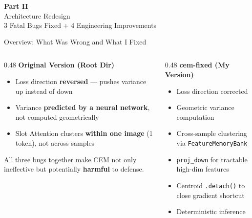\documentclass[aspectratio=169, 10pt]{beamer}
\newcommand{\fix}[1]{\textcolor{goodgreen}{\textbf{#1}}}
\newcommand{\code}[1]{\texttt{\small #1}}
\newcommand{\good}[1]{\textcolor{goodgreen}{#1}}
\newcommand{\bad}[1]{\textcolor{bugred}{#1}}
\begin{document}

\begin{frame}{}
\vfill
\begin{center}
{\Huge\textbf{Part II}}\\[0.3cm]
{\Large Architecture Redesign}\\[0.2cm]
{\normalsize 3 Fatal Bugs Fixed + 4 Engineering Improvements}
\end{center}
\vfill
\end{frame}

\begin{frame}{Overview: What Was Wrong and What I Fixed}

\begin{columns}[T]
\begin{column}{0.48\textwidth}
\textbf{\bad{Original Version (Root Dir)}}\\[0.15cm]
\begin{itemize}\setlength{\itemsep}{3pt}
    \item[\bad{$\times$}] Loss direction \textbf{reversed} --- pushes variance up instead of down
    \item[\bad{$\times$}] Variance \textbf{predicted by a neural network}, not computed geometrically
    \item[\bad{$\times$}] Slot Attention clusters \textbf{within one image} (1 token), not across samples
\end{itemize}
\vspace{0.1cm}
{\small All three bugs together make CEM not only ineffective but potentially \textbf{harmful} to defense.}
\end{column}
\begin{column}{0.48\textwidth}
\textbf{\fix{cem-fixed (My Version)}}\\[0.15cm]
\begin{itemize}\setlength{\itemsep}{3pt}
    \item[\good{$\checkmark$}] Loss direction corrected
    \item[\good{$\checkmark$}] Geometric variance computation
    \item[\good{$\checkmark$}] Cross-sample clustering via \code{FeatureMemoryBank}
    \item[\good{$\checkmark$}] \code{proj\_down} for tractable high-dim features
    \item[\good{$\checkmark$}] Centroid \code{.detach()} to close gradient shortcut
    \item[\good{$\checkmark$}] Deterministic inference
\end{itemize}
\end{column}
\end{columns}

\end{frame}
\end{document}
